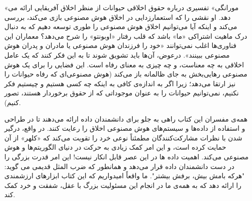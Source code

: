 «مورانگی» تفسیری درباره حقوق اخلاقی حیوانات از منظر اخلاق آفریقایی ارائه می دهد.
او نقشی را که استعمارزدایی در اخلاق هوش مصنوعی بازی می‌کند، بررسی می‌کند و اینکه آیا می‌توانیم اخلاق هوش مصنوعی را طوری توسعه دهیم که به دنبال درک ماهیت اشتراکی «ما» باشد که قلب رفتار «اوبونتو» را شرح می‌دهد؟ معماران این فناوری‌ها اغلب نمی‌توانند «خود را فرزندان هوش مصنوعی یا مادران و پدران هوش مصنوعی ببینند».
درعوض، آن‌ها باید تشویق شوند تا به این فکر کنند که یک عامل اخلاقی به چه معناست، و چه چیزی به معنای رفاه است.
این فضایی را برای یک هوش مصنوعی رهایی‌بخش به جای ظالمانه باز می‌کند (هوش مصنوعی‌ای که رفاه حیوانات را نیز ارتقا می‌دهد؛ زیرا اگر به اندازه‌ی کافی به اینکه چه کسی هستیم و چیستیم فکر نکنیم، نمی‌توانیم حیوانات را به عنوان موجوداتی که از حقوق برخوردار هستند، تصور کنیم).

همه‌ی مفسران این کتاب راهی به جلو برای دانشمندان داده ارائه می‌دهند تا در طراحی و استفاده از داده‌ها و سیستم‌های هوش مصنوعی اخلاق را رعایت کنند.
در واقع، درگیر شدن با نظرات مشارکت‌کنندگان مطمئناً نوعی خرد را تقویت می‌کند که «کلهر» از آن حمایت کرده است، و این امر کمک زیادی به حرکت در دنیای الگوریتم‌ها و هوش مصنوعی می‌کند.
اهمیت داده ها در این عصر قابل انکار نیست!
این امر قدرت بزرگی را در دست دانشمندان داده قرار می‌دهد و همانطور که ضرب المثل قدیمی می گوید: "هرکه بامش بیش، برفش بیشتر".
ما واقعاً امیدواریم که این کتاب ابزارهای ارزشمندی را ارائه دهد که به همه‌ی ما در انجام این مسئولیت بزرگ با عقل، شفقت و خرد کمک کند.